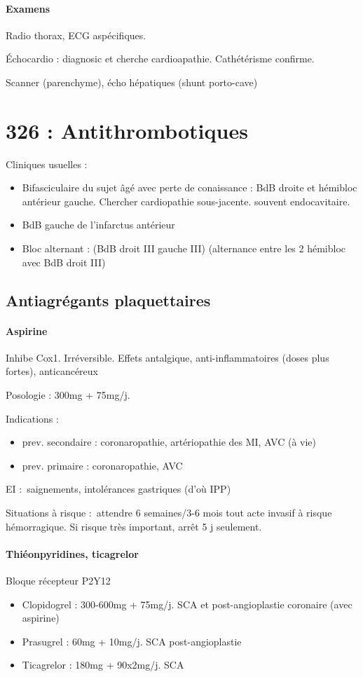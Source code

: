 \paragraph{Examens}
Radio thorax, ECG aspécifiques.

Échocardio : diagnosic et cherche cardioapathie. Cathétérisme confirme.

Scanner (parenchyme), écho hépatiques (shunt porto-cave)
\section{326 : Antithrombotiques}%
\label{sec:326_antithrombotiques}


Cliniques usuelles : 
\begin{itemize}
  \item Bifasciculaire du sujet âgé avec perte de conaissance : BdB droite et
    hémibloc antérieur gauche. Chercher cardiopathie sous-jacente. souvent
    endocavitaire.
  \item BdB gauche de l'infarctus antérieur
  \item Bloc alternant : (BdB droit III \land{} gauche III) \lor{} (alternance
    entre les 2 hémibloc avec BdB droit III)
\end{itemize}
\subsection{Antiagrégants plaquettaires}
\paragraph{Aspirine}
Inhibe Cox1. Irréversible. Effets antalgique, anti-inflammatoires (doses plus
fortes), anticancéreux

Posologie : 300mg + 75mg/j.

Indications : 
\begin{itemize}
  \item prev. secondaire : coronaropathie, artériopathie des MI, AVC (à
vie)
\item  prev. primaire : coronaropathie, AVC
\end{itemize}

EI : saignements, intolérances gastriques (d'où IPP)

Situations à risque : attendre 6 semaines/3-6 mois tout acte invasif à risque
hémorragique. Si risque très important, arrêt 5 j seulement.

\paragraph{Thiéonpyridines, ticagrelor}
Bloque récepteur P2Y12
\begin{itemize}
  \item Clopidogrel : 300-600mg + 75mg/j. SCA et post-angioplastie coronaire
    (avec aspirine)
  \item Prasugrel : 60mg + 10mg/j. SCA post-angioplastie 
  \item Ticagrelor : 180mg + 90x2mg/j. SCA 
\end{itemize}

